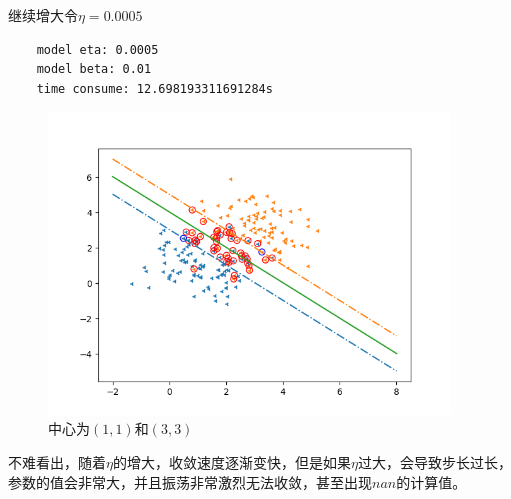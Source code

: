\documentclass{article}
\begin{document}
继续增大令$\eta=0.0005$
\begin{verbatim}
    model eta: 0.0005
    model beta: 0.01
    time consume: 12.698193311691284s
    \end{verbatim}
\begin{figure}[H]
        \centering
        \begin{minipage}[t]{1.0\linewidth}
            \centering
            \includegraphics[height=8cm]{runtime_3.png}
            \caption{中心为$(1,1)$和$(3,3)$}
        \end{minipage}
     \end{figure}
不难看出，随着$\eta$的增大，收敛速度逐渐变快，但是如果$\eta$过大，会导致步长过长，参数的值会非常大，并且振荡非常激烈无法收敛，甚至出现$nan$的计算值。
\end{document}
